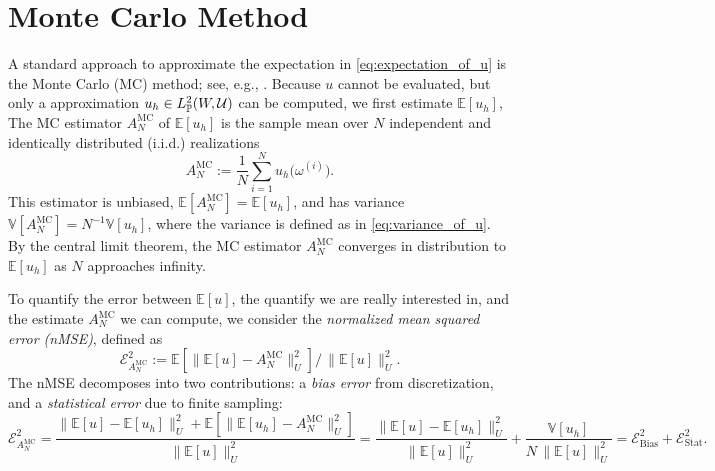 
\section{Monte Carlo Method}\label{sec:MC}

A standard approach to approximate the expectation in \eqref{eq:expectation_of_u} is the Monte Carlo (MC) method; 
see, e.g.,  \cite{MBGiles_2015a,MDGunzburger_CGWebster_GZhang_2014a}.
Because $u$ cannot be evaluated, but only a approximation $u_h \in   L_{\mathbb{P}}^2(W, \mathcal{U})$ can be 
computed, we first estimate $\mathbb{E}[u_h ]$, 
The MC estimator $A^{\text{MC}}_{N}$ of $\mathbb{E}[u_h ]$ 
is the sample mean over $N$ independent and identically distributed (i.i.d.) realizations 
\begin{equation}\label{eq:MC_estimator}
    A^{\text{MC}}_{N} := \frac{1}{N}\sum_{i=1}^{N} u_h \big(\omega^{(i)} \big).
\end{equation}
%
This estimator is unbiased,  $\mathbb{E}[A^{\text{MC}}_{N}] = \mathbb{E}[u_h ]$, 
and has variance $\mathbb{V}[A^{\text{MC}}_{N}] = N^{-1} \mathbb{V}[u_h ]$, 
where the variance is defined as in \eqref{eq:variance_of_u}.
By the central limit theorem, the MC estimator $A^{\text{MC}}_{N}$ converges in distribution to $\mathbb{E}[u_h]$ as $N$ approaches infinity. 

To quantify the error between $\mathbb{E}[u]$, the quantify we are really interested in, and the estimate $A^{\text{MC}}_{N}$ we can compute,
we consider the  {\it normalized mean squared error (nMSE)}, defined as
 \[
             \mathcal{E}_{A^{\text{MC}}_{N}}^2:= \mathbb E\left[ \big\| \mathbb{E}[u]-A^{\text{MC}}_{N}  \big\| _{U}^2\right]  
                                                                           \big/ \, \big\| \mathbb{E}[u]  \big\| _{U}^2.
\] 
The nMSE decomposes into two contributions: a {\it bias error} from  discretization, and a {\it statistical error} due to finite sampling:
%
\[
\mathcal{E}_{A^{\text{MC}}_{N}}^2 
= \frac{ \big\| \mathbb{E}[u]-\mathbb{E}[u_h ]  \big\| _{U}^2
               +\mathbb E\left[ \big\|  \mathbb{E}[u_h ] -A^{\text{MC}}_{N}  \big\| _{U}^2\right]}{ \big\| \mathbb{E}[u]  \big\| _{U}^2} 
= \frac{ \big\| \mathbb{E}[u]-\mathbb{E}[u_h ]  \big\| _{U}^2}{ \big\| \mathbb{E}[u]  \big\| _{U}^2}
    +\frac{\mathbb{V}\left[u_h \right]} {N \, \big\| \mathbb{E}[u]  \big\| _{U}^2}
=\mathcal{E}_{\text{Bias}}^2 + \mathcal{E}_{\text{Stat}}^2.
\]



